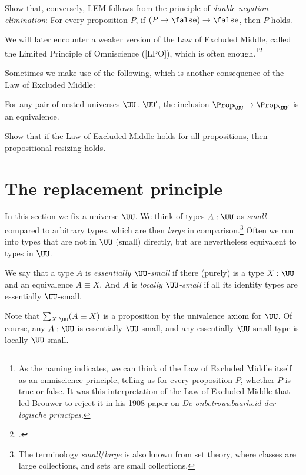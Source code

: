 
\begin{xca}\label{xca:dne-lem}
  Show that, conversely, LEM follows from the principle of
  \emph{double-negation elimination}:
  For every proposition $P$, if $(P\to\false)\to\false$, then $P$ holds.
\end{xca}

\begin{remark}
  We will later encounter a weaker version of the Law of Excluded Middle, called the Limited
  Principle of Omniscience (\cref{LPO}), which is often enough.\footnote{%
    As the naming indicates, we can think of the Law of Excluded Middle itself as an omniscience
    principle, telling us for every proposition $P$,
    whether $P$ is true or false.
    It was this interpretation of the Law of Excluded Middle that led Brouwer to reject it
    in his 1908 paper on \emph{De onbetrouwbaarheid der logische
      principes}.\footnotemark{}}\footcitetext{Brouwer-1908}
\end{remark}

Sometimes we make use of the following,
which is another consequence of the Law of Excluded Middle:
\begin{principle}
  \label{pri:prop-resizing}
  For any pair of nested universes $\UU:\UU'$, the inclusion
  $\Prop_\UU \to \Prop_{\UU'}$ is an equivalence.
\end{principle}
\begin{xca}\label{xca:lem-prop-sizing}
  Show that if the Law of Excluded Middle holds for all propositions,
  then propositional resizing holds.
\end{xca}


\section{The replacement principle}
\label{sec:replacement}

In this section we fix a universe $\UU$.
We think of types $A:\UU$ as \emph{small} compared to arbitrary types,
which are then \emph{large} in comparison.\footnote{%
  The terminology \emph{small}/\emph{large} is also known from set theory,
  where classes are large collections,
  and sets are small collections.}
Often we run into types that are not in $\UU$ (small) directly,
but are nevertheless equivalent to types in $\UU$.
\begin{definition}\label{def:ess-loc-small}
  We say that a type $A$ is \emph{essentially $\UU$-small} if there
  (purely) is a type $X:\UU$ and an equivalence $A \equiv
  X$. And $A$ is \emph{locally $\UU$-small} if all its identity types
  are essentially $\UU$-small.
\end{definition}
Note that $\sum_{X:\UU}(A \equiv X)$ is a proposition by the univalence axiom for $\UU$.
Of course, any $A:\UU$ is essentially $\UU$-small,
and any essentially $\UU$-small type is locally $\UU$-small.

